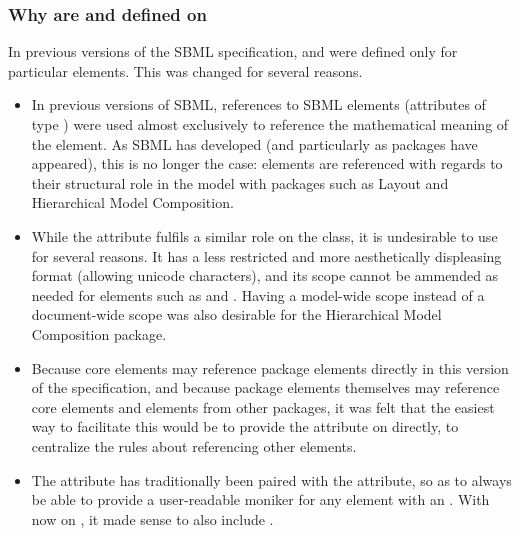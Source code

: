 \begin{blockChanged}
\subsubsection{Why are  and  defined on }
\label{sec:why-on-sbase}

In previous versions of the SBML specification,  and  were defined only for particular elements.  This was changed for several reasons.
\begin{itemize}
  
\item In previous versions of SBML, references to SBML elements (attributes of type ) were used almost exclusively to reference the mathematical meaning of the element.  As SBML has developed (and particularly as packages have appeared), this is no longer the case:  elements are referenced with regards to their structural role in the model with packages such as Layout and Hierarchical Model Composition.

\item While the  attribute fulfils a similar role on the \SBase class, it is undesirable to use for several reasons.  It has a less restricted and more aesthetically displeasing format (allowing unicode characters), and its scope cannot be ammended as needed for elements such as \UnitDefinitions and \LocalParameters.  Having a model-wide scope instead of a document-wide scope was also desirable for the Hierarchical Model Composition package.

\item Because core elements may reference package elements directly in this version of the specification, and because package elements themselves may reference core elements and elements from other packages, it was felt that the easiest way to facilitate this would be to provide the  attribute on \SBase directly, to centralize the rules about referencing other elements.

\item The  attribute has traditionally been paired with the  attribute, so as to always be able to provide a user-readable moniker for any element with an .  With  now on \SBase, it made sense to also include .

\end{itemize}
\end{blockChanged}

